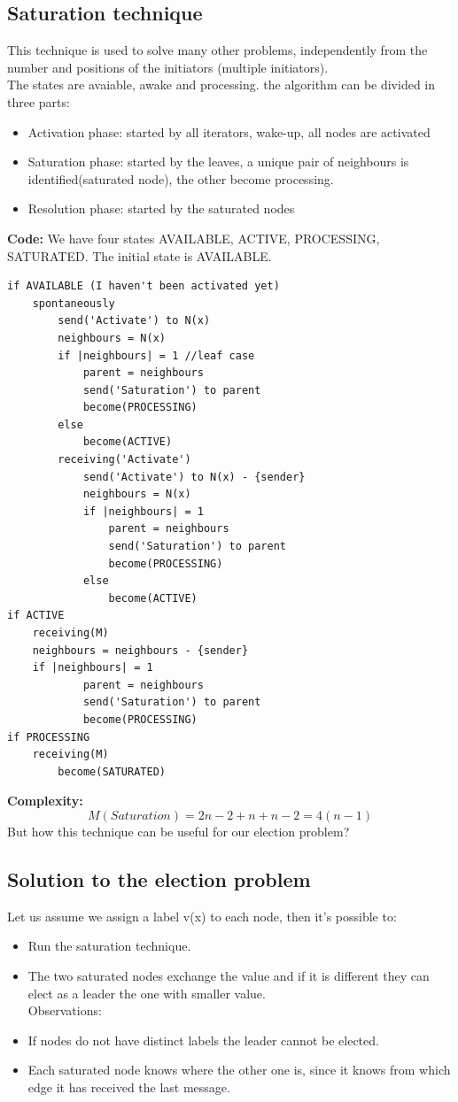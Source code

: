 \documentclass[paper=a4, fontsize=11pt]{scrartcl} %
\numberwithin{equation}{section} %
\numberwithin{figure}{section} %
\numberwithin{table}{section} %
\begin{document}
\subsection*{Saturation technique}
This technique is used to solve many other problems, independently from the number and positions of the initiators (multiple initiators).\\
The states are avaiable, awake and processing. the algorithm can be divided in three parts:
\begin{itemize}
\item Activation phase: started by all iterators, wake-up, all nodes are activated
\item Saturation phase: started by the leaves, a unique pair of neighbours is identified(saturated node), the other become processing.
\item Resolution phase: started by the saturated nodes
\end{itemize}
\textbf{Code:} We have four states AVAILABLE, ACTIVE, PROCESSING, SATURATED. The initial state is AVAILABLE.
\begin{lstlisting}
if AVAILABLE (I haven't been activated yet)
	spontaneously
		send('Activate') to N(x)
		neighbours = N(x)
		if |neighbours| = 1 //leaf case
			parent = neighbours
			send('Saturation') to parent
			become(PROCESSING)
		else
			become(ACTIVE)	
		receiving('Activate')
			send('Activate') to N(x) - {sender}
			neighbours = N(x)
			if |neighbours| = 1
				parent = neighbours
				send('Saturation') to parent
				become(PROCESSING)
			else
				become(ACTIVE)
if ACTIVE
	receiving(M)
	neighbours = neighbours - {sender}
	if |neighbours| = 1
			parent = neighbours
			send('Saturation') to parent
			become(PROCESSING)
if PROCESSING
	receiving(M)
		become(SATURATED)					
\end{lstlisting}
\textbf{Complexity:} $$M(Saturation) = 2n -2+n+n-2 = 4(n-1)$$ 
But how this technique can be useful for our election problem?
\subsection*{Solution to the election problem}
Let us assume we assign a label v(x) to each node, then it's possible to:
\begin{itemize}
\item Run the saturation technique.
\item The two saturated nodes exchange the value and if it is different they can elect as a leader the one with smaller value.\\
Observations:
\item If nodes do not have distinct labels the leader cannot be elected.
\item Each saturated node knows where the other one is, since it knows from which edge it has received the last message.
\end{itemize}
\end{document}
